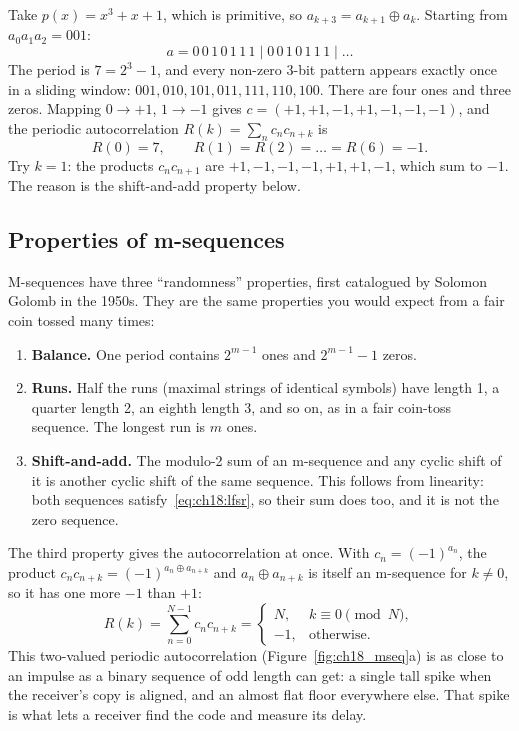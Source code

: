 \begin{worked}
Take $p(x)=x^3+x+1$, which is primitive, so $a_{k+3}=a_{k+1}\oplus a_k$. Starting from
$a_0a_1a_2=001$:
\[
a=0\,0\,1\,0\,1\,1\,1\;|\;0\,0\,1\,0\,1\,1\,1\;|\;\dots
\]
The period is $7=2^3-1$, and every non-zero 3-bit pattern appears exactly once in a sliding
window: $001,010,101,011,111,110,100$. There are four ones and three zeros. Mapping
$0\to+1$, $1\to-1$ gives $c=(+1,+1,-1,+1,-1,-1,-1)$, and the periodic autocorrelation
$R(k)=\sum_nc_nc_{n+k}$ is
\[
R(0)=7,\qquad R(1)=R(2)=\dots=R(6)=-1.
\]
Try $k=1$: the products $c_nc_{n+1}$ are $+1,-1,-1,-1,+1,+1,-1$, which sum to $-1$. The
reason is the shift-and-add property below.
\end{worked}

\subsection{Properties of m-sequences}

M-sequences have three ``randomness'' properties, first catalogued by Solomon Golomb in the
1950s. They are the same properties you would expect from a fair coin tossed many times:
\begin{enumerate}
\item \textbf{Balance.} One period contains $2^{m-1}$ ones and $2^{m-1}-1$ zeros.
\item \textbf{Runs.} Half the runs (maximal strings of identical symbols) have length 1,
a quarter length 2, an eighth length 3, and so on, as in a fair coin-toss sequence. The
longest run is $m$ ones.
\item \textbf{Shift-and-add.} The modulo-2 sum of an m-sequence and any cyclic shift of it is
another cyclic shift of the same sequence. This follows from linearity: both sequences
satisfy~\eqref{eq:ch18:lfsr}, so their sum does too, and it is not the zero sequence.
\end{enumerate}
The third property gives the autocorrelation at once. With $c_n=(-1)^{a_n}$, the product
$c_nc_{n+k}=(-1)^{a_n\oplus a_{n+k}}$ and $a_n\oplus a_{n+k}$ is itself an m-sequence for
$k\ne0$, so it has one more $-1$ than $+1$:
\begin{equation}
R(k)=\sum_{n=0}^{N-1}c_nc_{n+k}=\begin{cases}N,&k\equiv0\pmod N,\\-1,&\text{otherwise.}\end{cases}
\label{eq:ch18:mseqacf}
\end{equation}
This two-valued periodic autocorrelation (Figure~\ref{fig:ch18_mseq}a) is as close to an impulse
as a binary sequence of odd length can get: a single tall spike when the receiver's copy is aligned, and an almost flat
floor everywhere else. That spike is what lets a receiver find the code and measure its delay.

